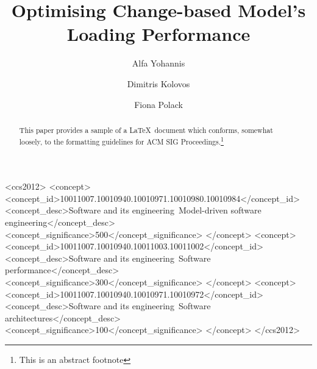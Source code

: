 \documentclass[sigconf]{acmart}
\begin{document}
\title{Optimising Change-based Model's Loading Performance}


\author{Alfa Yohannis}

\author{Dimitris Kolovos}

\author{Fiona Polack}

\renewcommand{\shortauthors}{A. Yohannis et al.}


\begin{abstract}
This paper provides a sample of a \LaTeX\ document which conforms,
somewhat loosely, to the formatting guidelines for
ACM SIG Proceedings.\footnote{This is an abstract footnote}
\end{abstract}

%
%

\begin{CCSXML}
<ccs2012>
<concept>
<concept_id>10011007.10010940.10010971.10010980.10010984</concept_id>
<concept_desc>Software and its engineering~Model-driven software engineering</concept_desc>
<concept_significance>500</concept_significance>
</concept>
<concept>
<concept_id>10011007.10010940.10011003.10011002</concept_id>
<concept_desc>Software and its engineering~Software performance</concept_desc>
<concept_significance>300</concept_significance>
</concept>
<concept>
<concept_id>10011007.10010940.10010971.10010972</concept_id>
<concept_desc>Software and its engineering~Software architectures</concept_desc>
<concept_significance>100</concept_significance>
</concept>
</ccs2012>
\end{CCSXML}
\end{document}
